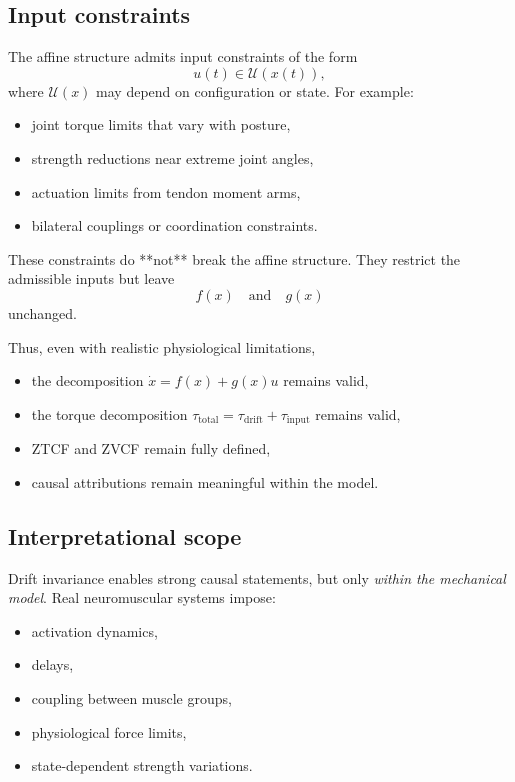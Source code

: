 \documentclass[12pt]{article}
\newcommand{\xd}{\dot{x}}
\begin{document}
\subsection{Input constraints}
\label{subsec:input_constraints}

The affine structure admits input constraints of the form
\begin{equation}
  u(t) \in \mathcal{U}(x(t)),
  \label{eq:input_constraints}
\end{equation}
where \(\mathcal{U}(x)\) may depend on configuration or state.  
For example:
\begin{itemize}
  \item joint torque limits that vary with posture,
  \item strength reductions near extreme joint angles,
  \item actuation limits from tendon moment arms,
  \item bilateral couplings or coordination constraints.
\end{itemize}

These constraints do **not** break the affine structure.  
They restrict the admissible inputs but leave
\[
  f(x) \quad \text{and} \quad g(x)
\]
unchanged.

Thus, even with realistic physiological limitations,
\begin{itemize}
  \item the decomposition \( \xd = f(x) + g(x)u \) remains valid,
  \item the torque decomposition \( \tau_{\text{total}} = \tau_{\text{drift}} + \tau_{\text{input}} \) remains valid,
  \item ZTCF and ZVCF remain fully defined,
  \item causal attributions remain meaningful within the model.
\end{itemize}

\subsection{Interpretational scope}

Drift invariance enables strong causal statements, but only \emph{within the mechanical model}.  
Real neuromuscular systems impose:
\begin{itemize}
  \item activation dynamics,
  \item delays,
  \item coupling between muscle groups,
  \item physiological force limits,
  \item state-dependent strength variations.
\end{itemize}
\end{document}
